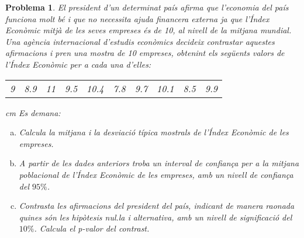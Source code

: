 \documentclass[a4paper,12pt]{article}
\newcounter{prbcont}
\newtheorem{problema}[prbcont]{Problema}
\begin{document}
\vskip 0.5cm
\begin{problema}
El president d'un determinat país afirma que l'economia del país funciona molt bé i que no necessita ajuda
financera externa ja que l'Índex Econòmic mitjà de les seves empreses és de 10, al nivell de la mitjana mundial. 
Una agència internacional d'estudis econòmics decideix contrastar aquestes afirmacions i pren una mostra de
10 empreses, obtenint els següents valors de l'Índex Econòmic per a cada una d'elles:

\begin{center}
\begin{tabular}{cccccccccc}
9 & 8.9 & 11 & 9.5 & 10.4 & 7.8 & 9.7 & 10.1 & 8.5 & 9.9 
\end{tabular}
\end{center}

 cm
Es demana:

\begin{enumerate}[a)]
\item Calcula la mitjana i la desviació típica mostrals de l'Índex Econòmic de les empreses.
\item A partir de les dades anteriors troba un interval de confiança per a la mitjana poblacional de l'Índex Econòmic de les empreses,
amb un nivell de confiança del $95\%$.
\item Contrasta les afirmacions del president del país, indicant de manera raonada quines són les hipòtesis nul.la i alternativa,
amb un nivell de significació del $10\%$. Calcula el p-valor del contrast.
\end{enumerate}
\end{problema}
\end{document}
